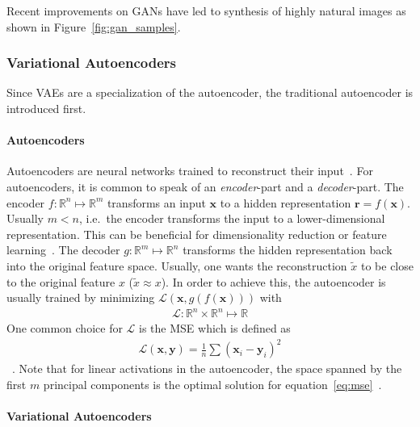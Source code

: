Recent improvements on \acp{GAN} have led to synthesis of highly natural images as shown in Figure~\ref{fig:gan_samples}.

\subsubsection{Variational Autoencoders}\label{subsec:variational-autoencoders}

Since \acfp{VAE} are a specialization of the autoencoder, the traditional autoencoder is introduced first.

\paragraph{Autoencoders}

Autoencoders are neural networks trained to reconstruct their input~\citep[p. 499]{Goodfellow-et-al-2016}.
For autoencoders, it is common to speak of an \textit{encoder}-part and a \textit{decoder}-part.
The encoder $f: \mathbb{R}^n \mapsto \mathbb{R}^m$ transforms an input $\bm{x}$ to a hidden representation $\bm{r} = f(\bm{x})$.
Usually $m < n$, i.e.\ the encoder transforms the input to a lower-dimensional representation.
This can be beneficial for dimensionality reduction or feature learning~\citep[p. 499]{Goodfellow-et-al-2016}.
The decoder $g: \mathbb{R}^m \mapsto \mathbb{R}^n$ transforms the hidden representation back into the original feature space.
Usually, one wants the reconstruction $\tilde{x}$ to be close to the original feature $x$ ($\tilde{x} \approx x$).
In order to achieve this, the autoencoder is usually trained by minimizing $\mathcal{L}(\bm{x}, g(f(\bm{x})))$ with
\begin{align}
    \mathcal{L}: \mathbb{R}^n \times \mathbb{R}^n \mapsto \mathbb{R}
\end{align}
One common choice for $\mathcal{L}$ is the \ac{MSE} which is defined as
\begin{align}
    \mathcal{L}(\bm{x}, \bm{y}) = \frac{1}{n}\sum (\bm{x}_i - \bm{y}_i)^2 \label{eq:mse}
\end{align}~\citep[p. 106]{Goodfellow-et-al-2016}.
Note that for linear activations in the autoencoder, the space spanned by the first $m$ principal components is the optimal solution for equation~\ref{eq:mse}~\citep{chicco2014deep}.

\paragraph{Variational Autoencoders}

